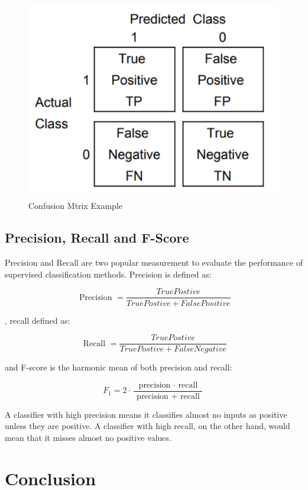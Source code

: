 \begin{figure}[hbtp]
\caption{Confusion Mtrix Example}
\includegraphics[scale=.5]{../Figures/Confuse_Mat_Example.png}\centering
\end{figure}

\subsection{Precision, Recall and F-Score}

Precision and Recall are two popular measurement to evaluate the performance of supervised classification methods. Precision is defined as:

$$\text { Precision } = \frac { True Postive } { True Postive + False Positive }$$

, recall defined as:

$$\text { Recall } = \frac { True Postive } { True Postive + False Negative }$$

and F-score is the harmonic mean of both precision and recall:

$$F _ { 1 } = 2 \cdot \frac { \text { precision } \cdot \text { recall } } { \text { precision } + \text { recall } }$$

A classifier with high precision means it classifies almost no inputs as positive unless they are positive. A classifier with high recall, on the other hand, would mean that  it misses almost no positive values. 
\section{Conclusion}

